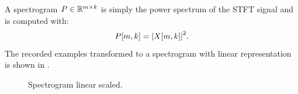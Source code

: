 
A spectrogram $P \in \mathbb{R}^{m \times k}$ is simply the power spectrum of the STFT signal and is computed with:
\begin{equation}\label{eq:signal_spec_spec}
  P[m, k] = \abs{X[m, k]}^2.
\end{equation}
The recorded examples transformed to a spectrogram with linear representation is shown in .
\begin{figure}[!ht]
  \centering
  \caption{Spectrogram linear scaled.}
  \label{fig:signal_spec_lin_examples}
\end{figure}
